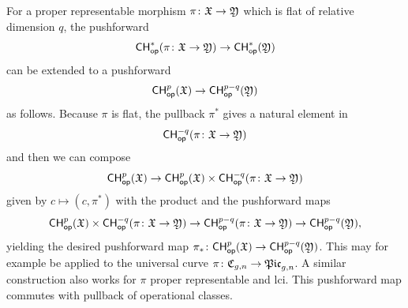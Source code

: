 \documentclass[a4paper,12pt]{article} %
\theoremstyle{definition}
\theoremstyle{plain}%
\newtheorem{lemma}[definition]{Lemma}
\renewcommand{\phi}{\varphi}
\newcommand{\Picabs}{\mathfrak{Pic}}
\newcommand{\Chow}{\mathsf{CH}}
\newcommand{\CHop}{\Chow_{\mathsf{op}}}
\begin{document}
For a proper representable morphism $\pi\colon \frak X \to \frak Y$ which is flat of relative dimension $q$, the pushforward 
\[\CHop^*(\pi\colon \frak X \to \frak Y) \to \CHop^*(\frak Y)\]
can be extended to a pushforward
$$\CHop^{p}(\frak X)\to \CHop^{p-q} (\frak Y) $$
as follows. Because $\pi$ is flat, the pullback $\pi^*$ gives a natural element in $$\CHop^{-q}(\pi\colon \frak X \to \frak Y)$$ %
and then we can compose
\[\CHop^{p}(\frak X)\to \CHop^{p}(\frak X) \times \CHop^{-q}(\pi\colon \frak X \to \frak Y) \]
given by $c \mapsto  (c,\pi^*)$ with the product and the pushforward maps 
\[\CHop^{p}(\frak X) \times \CHop^{-q}(\pi\colon \frak X \to \frak Y) \to \CHop^{p-q}(\pi\colon \frak X \to \frak Y) \to \CHop^{p-q}(\frak Y),\]
yielding the desired pushforward map $\pi_*\colon \CHop^{p}(\frak X)\to \CHop^{p-q} (\frak Y)$. This may for example be applied to the universal curve $\pi\colon \frak C_{g,n} \to \Picabs_{g,n}$. A similar construction also works for $\pi$ proper representable and lci. This pushforward map commutes with pullback of operational classes.
%
\end{document}

